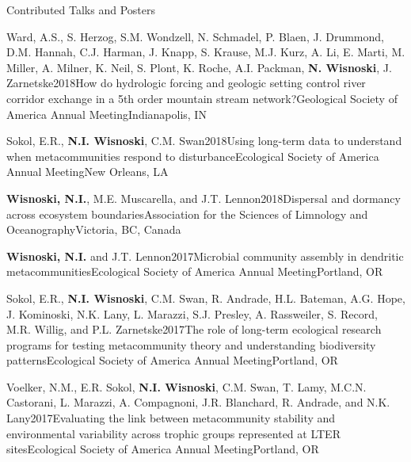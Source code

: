 \documentclass{resume} %
\begin{document}
\begin{rhangSection}{Contributed Talks and Posters}
  
  \begin{Presentation}{Ward, A.S., S. Herzog, S.M. Wondzell, N. Schmadel, P. Blaen, J. Drummond, D.M. Hannah, C.J. Harman, J. Knapp, S. Krause, M.J. Kurz, A. Li, E. Marti, M. Miller, A. Milner, K. Neil, S. Plont, K. Roche, A.I. Packman, {\bf N. Wisnoski}, J. Zarnetske}{2018}{How do hydrologic forcing and geologic setting control river corridor exchange in a 5th order mountain stream network?}{Geological Society of America Annual Meeting}{Indianapolis, IN}
  \end{Presentation}
  
  \begin{Presentation}{Sokol, E.R., {\bf N.I. Wisnoski}, C.M. Swan}{2018}{Using long-term data to understand when metacommunities respond to disturbance}{Ecological Society of America Annual Meeting}{New Orleans, LA}
  \end{Presentation}

  \begin{Presentation}{{\bf Wisnoski, N.I.}, M.E. Muscarella, and J.T. Lennon}{2018}{Dispersal and dormancy across ecosystem boundaries}{Association for the Sciences of Limnology and Oceanography}{Victoria, BC, Canada}
  \end{Presentation}

  \begin{Presentation}{{\bf Wisnoski, N.I.} and J.T. Lennon}{2017}{Microbial community assembly in dendritic metacommunities}{Ecological Society of America Annual Meeting}{Portland, OR}
  \end{Presentation}
  
  \begin{Presentation}{Sokol, E.R., {\bf N.I. Wisnoski}, C.M. Swan, R. Andrade, H.L. Bateman, A.G. Hope, J. Kominoski, N.K. Lany, L. Marazzi, S.J. Presley, A. Rassweiler, S. Record, M.R. Willig, and P.L.
Zarnetske}{2017}{The role of long-term ecological research programs for testing
metacommunity theory and understanding biodiversity patterns}{Ecological Society of
America Annual Meeting}{Portland, OR}
  \end{Presentation}
  
  \begin{Presentation}{Voelker, N.M., E.R. Sokol, {\bf N.I. Wisnoski}, C.M. Swan, T. Lamy, M.C.N. Castorani, L. Marazzi, A. Compagnoni, J.R. Blanchard, R. Andrade, and N.K. Lany}{2017}{Evaluating the link between metacommunity stability and environmental variability across trophic groups represented at LTER sites}{Ecological Society of America Annual Meeting}{Portland, OR}
  \end{Presentation}


\end{rhangSection}
\end{document}
